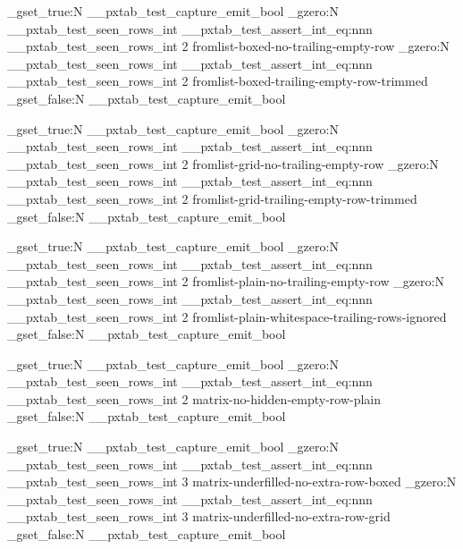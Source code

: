 \documentclass{article}
\begin{document}

\bool_gset_true:N \g__pxtab_test_capture_emit_bool
\int_gzero:N \g__pxtab_test_seen_rows_int
\__pxtab_test_assert_int_eq:nnn
  { \g__pxtab_test_seen_rows_int }
  { 2 }
  { fromlist-boxed-no-trailing-empty-row }
\int_gzero:N \g__pxtab_test_seen_rows_int
\__pxtab_test_assert_int_eq:nnn
  { \g__pxtab_test_seen_rows_int }
  { 2 }
  { fromlist-boxed-trailing-empty-row-trimmed }
\bool_gset_false:N \g__pxtab_test_capture_emit_bool

\bool_gset_true:N \g__pxtab_test_capture_emit_bool
\int_gzero:N \g__pxtab_test_seen_rows_int
\__pxtab_test_assert_int_eq:nnn
  { \g__pxtab_test_seen_rows_int }
  { 2 }
  { fromlist-grid-no-trailing-empty-row }
\int_gzero:N \g__pxtab_test_seen_rows_int
\__pxtab_test_assert_int_eq:nnn
  { \g__pxtab_test_seen_rows_int }
  { 2 }
  { fromlist-grid-trailing-empty-row-trimmed }
\bool_gset_false:N \g__pxtab_test_capture_emit_bool

\bool_gset_true:N \g__pxtab_test_capture_emit_bool
\int_gzero:N \g__pxtab_test_seen_rows_int
\__pxtab_test_assert_int_eq:nnn
  { \g__pxtab_test_seen_rows_int }
  { 2 }
  { fromlist-plain-no-trailing-empty-row }
\int_gzero:N \g__pxtab_test_seen_rows_int
\__pxtab_test_assert_int_eq:nnn
  { \g__pxtab_test_seen_rows_int }
  { 2 }
  { fromlist-plain-whitespace-trailing-rows-ignored }
\bool_gset_false:N \g__pxtab_test_capture_emit_bool

\bool_gset_true:N \g__pxtab_test_capture_emit_bool
\int_gzero:N \g__pxtab_test_seen_rows_int
\__pxtab_test_assert_int_eq:nnn
  { \g__pxtab_test_seen_rows_int }
  { 2 }
  { matrix-no-hidden-empty-row-plain }
\bool_gset_false:N \g__pxtab_test_capture_emit_bool

\bool_gset_true:N \g__pxtab_test_capture_emit_bool
\int_gzero:N \g__pxtab_test_seen_rows_int
\__pxtab_test_assert_int_eq:nnn
  { \g__pxtab_test_seen_rows_int }
  { 3 }
  { matrix-underfilled-no-extra-row-boxed }
\int_gzero:N \g__pxtab_test_seen_rows_int
\__pxtab_test_assert_int_eq:nnn
  { \g__pxtab_test_seen_rows_int }
  { 3 }
  { matrix-underfilled-no-extra-row-grid }
\bool_gset_false:N \g__pxtab_test_capture_emit_bool
\end{document}

